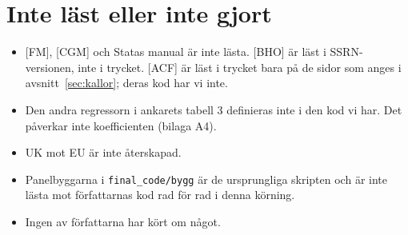 \documentclass[10pt,a4paper]{article}
\newcommand{\kod}[1]{\texttt{#1}}
\begin{document}
\section{Inte läst eller inte gjort}
\begin{itemize}[leftmargin=*,itemsep=1pt]
\item {[FM]}, [CGM] och Statas manual är inte lästa. [BHO] är läst i SSRN-versionen, inte i trycket. [ACF] är läst i trycket bara på de sidor som anges i avsnitt~\ref{sec:kallor}; deras kod har vi inte.
\item Den andra regressorn i ankarets tabell 3 definieras inte i den kod vi har. Det påverkar inte koefficienten (bilaga A4).
\item UK mot EU är inte återskapad.
\item Panelbyggarna i \kod{final\_code/bygg} är de ursprungliga skripten och är inte lästa mot författarnas kod rad för rad i denna körning.
\item Ingen av författarna har kört om något.
\end{itemize}
\end{document}
